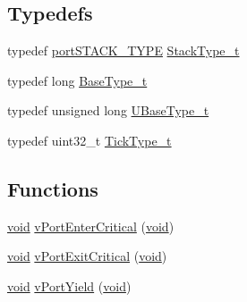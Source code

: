 \subsection*{Typedefs}
\begin{DoxyCompactItemize}
\item 
typedef \hyperlink{WizC_2PIC18_2portmacro_8h_ab0a294066ac7369b8f59a52d9491a92c}{port\-S\-T\-A\-C\-K\-\_\-\-T\-Y\-P\-E} \hyperlink{CCS_2ARM__Cortex-R4_2portmacro_8h_a84e9a8ba132feed0b2401c1f4e2ac63c}{Stack\-Type\-\_\-t}
\item 
typedef long \hyperlink{CCS_2ARM__Cortex-R4_2portmacro_8h_a46fb21e00ae0729d7515c0fbf2269796}{Base\-Type\-\_\-t}
\item 
typedef unsigned long \hyperlink{CCS_2ARM__Cortex-R4_2portmacro_8h_a646f89d4298e4f5afd522202b11cb2e6}{U\-Base\-Type\-\_\-t}
\item 
typedef uint32\-\_\-t \hyperlink{CCS_2ARM__Cortex-R4_2portmacro_8h_aa69c48c6e902ce54f70886e6573c92a9}{Tick\-Type\-\_\-t}
\end{DoxyCompactItemize}
\subsection*{Functions}
\begin{DoxyCompactItemize}
\item 
\hyperlink{Paradigm_2Tern__EE_2small_2portmacro_8h_a14d32f8130d3c0b212cfc751730b5b49}{void} \hyperlink{CCS_2ARM__Cortex-R4_2portmacro_8h_a2ed3554a3de09a3bd09d396ee081ab69}{v\-Port\-Enter\-Critical} (\hyperlink{Paradigm_2Tern__EE_2small_2portmacro_8h_a14d32f8130d3c0b212cfc751730b5b49}{void})
\item 
\hyperlink{Paradigm_2Tern__EE_2small_2portmacro_8h_a14d32f8130d3c0b212cfc751730b5b49}{void} \hyperlink{CCS_2ARM__Cortex-R4_2portmacro_8h_aed20ada05b957181a0de042802a82a5b}{v\-Port\-Exit\-Critical} (\hyperlink{Paradigm_2Tern__EE_2small_2portmacro_8h_a14d32f8130d3c0b212cfc751730b5b49}{void})
\item 
\hyperlink{Paradigm_2Tern__EE_2small_2portmacro_8h_a14d32f8130d3c0b212cfc751730b5b49}{void} \hyperlink{CCS_2ARM__Cortex-R4_2portmacro_8h_add01c927fb689f7ec170e42d47d27927}{v\-Port\-Yield} (\hyperlink{Paradigm_2Tern__EE_2small_2portmacro_8h_a14d32f8130d3c0b212cfc751730b5b49}{void})
\end{DoxyCompactItemize}


